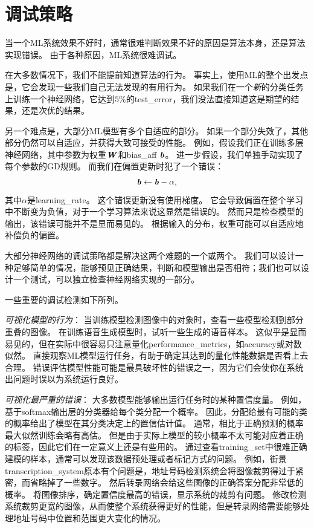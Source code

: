 \section{调试策略}
\label{sec:debugging_strategies}
当一个\gls{ML}系统效果不好时，通常很难判断效果不好的原因是算法本身，还是算法实现错误。
由于各种原因，\gls{ML}系统很难调试。


在大多数情况下，我们不能提前知道算法的行为。
事实上，使用\gls{ML}的整个出发点是，它会发现一些我们自己无法发现的有用行为。
如果我们在一个\emph{新}的分类任务上训练一个神经网络，它达到$5\%$的\gls{test_error}，我们没法直接知道这是期望的结果，还是次优的结果。


另一个难点是，大部分\gls{ML}模型有多个自适应的部分。
如果一个部分失效了，其他部分仍然可以自适应，并获得大致可接受的性能。
例如，假设我们正在训练多层神经网络，其中参数为权重$\boldsymbol{\mathit{W}}$和\gls{bias_aff} $\boldsymbol{\mathit{b}}$。
进一步假设，我们单独手动实现了每个参数的\gls{GD}规则。
而我们在偏置更新时犯了一个错误：
\begin{equation}
	\boldsymbol{\mathit{b}} \leftarrow \boldsymbol{\mathit{b}} - \alpha,
\end{equation}
其中$\alpha$是\gls{learning_rate}。
这个错误更新没有使用梯度。
它会导致偏置在整个学习中不断变为负值，对于一个学习算法来说这显然是错误的。 
然而只是检查模型的输出，该错误可能并不是显而易见的。
根据输入的分布，权重可能可以自适应地补偿负的偏置。


大部分神经网络的调试策略都是解决这两个难题的一个或两个。
我们可以设计一种足够简单的情况，能够预见正确结果，判断和模型输出是否相符；我们也可以设计一个测试，可以独立检查神经网络实现的一部分。%


一些重要的调试检测如下所列。

\emph{可视化模型的行为}：%
当训练模型检测图像中的对象时，查看一些模型检测到部分重叠的图像。
在训练语音生成模型时，试听一些生成的语音样本。
这似乎是显而易见的，但在实际中很容易只注意量化\gls{performance_metrics}，如\gls{accuracy}或对数似然。
直接观察\gls{ML}模型运行任务，有助于确定其达到的量化性能数据是否看上去合理。
错误评估模型性能可能是最具破坏性的错误之一，因为它们会使你在系统出问题时误以为系统运行良好。


\emph{可视化最严重的错误}：
大多数模型能够输出运行任务时的某种置信度量。
例如，基于\gls{softmax}输出层的分类器给每个类分配一个概率。
因此，分配给最有可能的类的概率给出了模型在其分类决定上的置信估计值。
通常，相比于正确预测的概率最大似然训练会略有高估。
但是由于实际上模型的较小概率不太可能对应着正确的标签，因此它们在一定意义上还是有些用的。
通过查看\gls{training_set}中很难正确建模的样本，通常可以发现该数据预处理或者标记方式的问题。
例如，街景\gls{transcription_system}原本有个问题是，地址号码检测系统会将图像裁剪得过于紧密，而省略掉了一些数字。
然后转录网络会给这些图像的正确答案分配非常低的概率。
将图像排序，确定置信度最高的错误，显示系统的裁剪有问题。
修改检测系统裁剪更宽的图像，从而使整个系统获得更好的性能，但是转录网络需要能够处理地址号码中位置和范围更大变化的情况。


